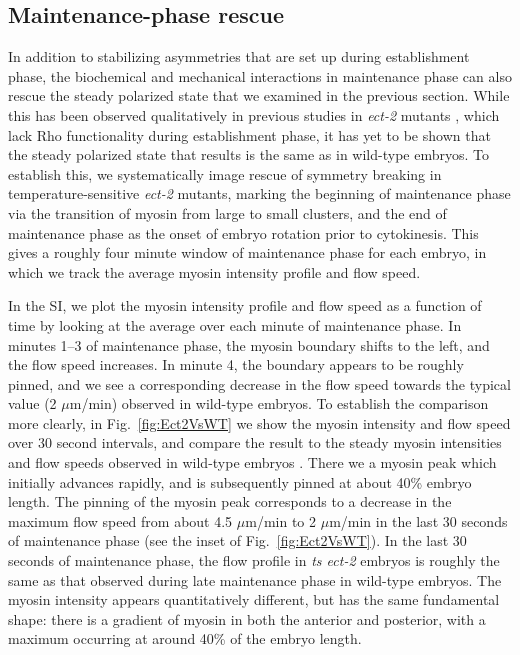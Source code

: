 \documentclass[11pt]{article}
\newcommand{\6}[1]{#1_{\text{6}}}
\newcommand{\3}[1]{#1_{\text{3}}}
\begin{document}
\subsection{Maintenance-phase rescue}
In addition to stabilizing asymmetries that are set up during establishment phase, the biochemical and mechanical interactions in maintenance phase can also rescue the steady polarized state that we examined in the previous section. While this has been observed qualitatively in previous studies  in \emph{ect-2} mutants \cite{zonies2010symmetry, tse2012rhoa}, which lack Rho functionality during establishment phase, it has yet to be shown that the steady polarized state that results is the same as in wild-type embryos. To establish this, we systematically image rescue of symmetry breaking in temperature-sensitive \emph{ect-2} mutants, marking the beginning of maintenance phase via the transition of myosin from large to small clusters, and the end of maintenance phase as the onset of embryo rotation prior to cytokinesis. This gives a roughly four minute window of maintenance phase for each embryo, in which we track the average myosin intensity profile and flow speed.

In the SI, we plot the myosin intensity profile and flow speed as a function of time by looking at the average over each minute of maintenance phase. In minutes 1--3 of maintenance phase, the myosin boundary shifts to the left, and the flow speed increases. In minute 4, the boundary appears to be roughly pinned, and we see a corresponding decrease in the flow speed towards the typical value (2 $\mu$m/min) observed in wild-type embryos. To establish the comparison more clearly, in Fig.\ \ref{fig:Ect2VsWT} we show the myosin intensity and flow speed over 30 second intervals, and compare the result to the steady myosin intensities and flow speeds observed in wild-type embryos \cite{sailer2015dynamic}. There we a myosin peak which initially advances rapidly, and is subsequently pinned at about 40\% embryo length. The pinning of the myosin peak corresponds to a decrease in the maximum flow speed from about 4.5 $\mu$m/min to 2 $\mu$m/min in the last 30 seconds of maintenance phase (see the inset of Fig.\ \ref{fig:Ect2VsWT}). In the last 30 seconds of maintenance phase, the flow profile in \emph{ts ect-2} embryos is roughly the same as that observed during late maintenance phase in wild-type embryos. The myosin intensity appears quantitatively different, but has the same fundamental shape: there is a gradient of myosin in both the anterior and posterior, with a maximum occurring at around 40\% of the embryo length.  
\end{document}
